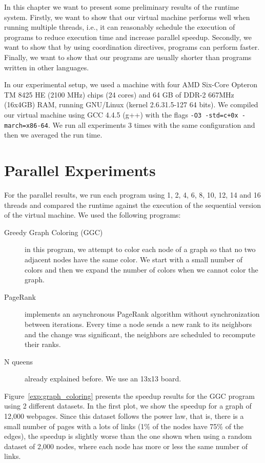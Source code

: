 In this chapter we want to present some preliminary results of the \lang runtime system.
Firstly, we want to show that our virtual machine performs well when running multiple threads,
i.e., it can reasonably schedule the execution of programs to reduce execution time and increase parallel speedup. Secondly, we want to show that by using coordination directives, programs can perform faster.
Finally, we want to show that our programs are usually shorter than programs written in other languages.  

In our experimental setup, we used a machine with
four AMD Six-Core Opteron TM 8425 HE (2100 MHz) chips (24 cores) and 64 GB of DDR-2 667MHz (16x4GB) RAM,
     running GNU/Linux (kernel 2.6.31.5-127 64 bits).
     We compiled our virtual machine using GCC 4.4.5 (g++) with the flags \texttt{-O3 -std=c+0x -march=x86-64}.
     We run all experiments 3 times with the same configuration and then we averaged the run time.

\section{Parallel Experiments}

For the parallel results, we run each program using 1, 2, 4, 6, 8, 10, 12, 14 and 16 threads and compared the runtime against the execution of the sequential version of the virtual machine. We used the following programs:

\newcommand{\figsize}[0]{6.5cm}
\captionsetup[sub]{              %
       font=scriptsize}

\begin{description}
   \item[Greedy Graph Coloring (GGC)] in this program, we attempt to color each node of a graph so that no two adjacent nodes have the same color. We start with a small number of colors and then we expand the number of colors when we cannot color the graph.
   \item[PageRank] implements an asynchronous PageRank algorithm without synchronization between iterations. Every time a node sends a new rank to its neighbors and the change was significant, the neighbors are scheduled to recompute their ranks.
   \item[N queens] already explained before. We use an 13x13 board.
\end{description}

Figure~\ref{exp:graph_coloring} presents the speedup results for the GGC program using 2 different datasets. In the first plot, we show the speedup for a graph of 12,000 webpages. Since this dataset follows the power law, that is, there is a small number of pages with a lots of links (1\% of the nodes have 75\% of the edges), the speedup is slightly worse than the one shown when using a random dataset of 2,000 nodes, where each node has more or less the same number of links.


